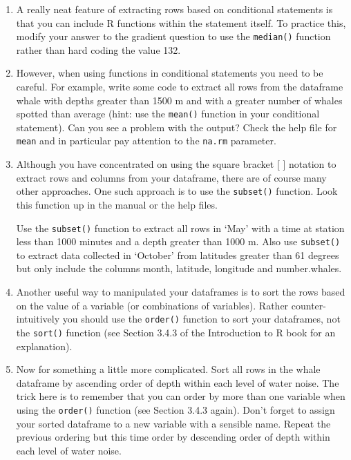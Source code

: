 \documentclass[12pt]{article}
\newcommand{\lst}[1]{\lstinline{#1}}
\begin{document}
\begin{enumerate}
\item A really neat feature of extracting rows based on conditional statements is that you can include R functions within the statement itself. To practice this, modify your answer to the gradient question to use the \lst{median()} function rather than hard coding the value 132.

\item However, when using functions in conditional statements you need to be careful. For example, write some code to extract all rows from the dataframe whale with depths greater than 1500 m and with a greater number of whales spotted than average (hint: use the \lst{mean()} function in your conditional statement). Can you see a problem with the output?   Check the help file for \lst{mean}
and in particular pay attention to the \lst{na.rm} parameter.


\item Although you have concentrated on using the square bracket [ ] notation to extract rows and columns from your dataframe, there are of course many other approaches. One such approach is to use the \lst{subset()} function. Look this function up in the manual or the help files.

Use the \lst{subset()} function to extract all rows in ‘May’ with a time at station less than 1000 minutes and a depth greater than 1000 m. Also use \lst{subset()} to extract data collected in ‘October’ from latitudes greater than 61 degrees but only include the columns month, latitude, longitude and number.whales.

\item Another useful way to manipulated your dataframes is to sort the rows based on the value of a variable (or combinations of variables). Rather counter-intuitively you should use the \lst{order()}
 function to sort your dataframes, not the \lst{sort()} function (see Section 3.4.3 of the Introduction to R book for an explanation). 
 

 
\item Now for something a little more complicated. Sort all rows in the whale dataframe by ascending order of depth within each level of water noise. The trick here is to remember that you can order by more than one variable when using the \lst{order()} function (see Section 3.4.3 again). Don’t forget to assign your sorted dataframe to a new variable with a sensible name. Repeat the previous ordering but this time order by descending order of depth within each level of water noise.


\end{enumerate}
\end{document}
